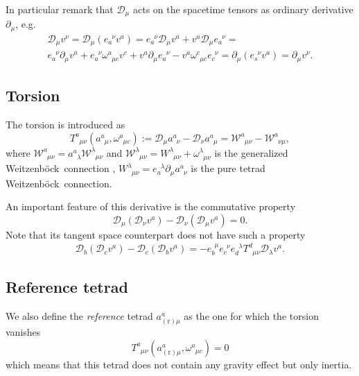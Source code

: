 \documentclass[
10pt, %
a4paper, %
oneside, %
headinclude,footinclude, %
BCOR5mm, %
]{scrartcl}
\newcommand{\pd}{\partial}
\newcommand{\itetr}[2]{e^{\phantom{#2}#1}_{#2}}
\newcommand{\tetr}[2]{a^{#1}_{\phantom{#1}#2}}
\newcommand{\rtetr}[2]{a^{#1}_{(\text{r}) #2}}
\newcommand{\spin}[2]{\omega^{#1}_{\phantom{#1}#2}}
\newcommand{\D}[1]{\mathcal{D}_{#1}} %
\newcommand{\Tors}[2]{T^{#1}_{\phantom{a}#2}}
\newcommand{\W}[2]{\mathcal{W}^{#1}_{\phantom{#1}#2}}
\newcommand{\w}[2]{W^{#1}_{\phantom{#1}#2}}
\newcommand{\We}{Weitzenb\"ock}
\begin{document}
In particular remark that $ \D{\mu} $ acts on the spacetime tensors as ordinary derivative $ 
\pd_\mu $, e.g.
\begin{multline}\label{eqn.covD.pd}
\D{\mu}v^{\nu} = \D{\mu}(\itetr{\nu}{a}v^a) = \itetr{\nu}{a}\D{\mu}v^a + v^a\D{\mu}\itetr{\nu}{a} = 
\\
\itetr{\nu}{a}\pd_{\mu}v^a + \itetr{\nu}{a}\spin{a}{\mu c}v^c + 
v^a\pd_{\mu}\itetr{\nu}{a} - v^a\spin{c}{\mu c}\itetr{\nu}{c} = \pd_\mu(\itetr{\nu}{s}v^a) = 
\pd_\mu v^\nu.
\end{multline}



\subsection{Torsion}

The torsion is introduced as
\begin{equation}
\Tors{a}{\mu\nu}(\tetr{a}{\mu},\spin{a}{\mu c}):=\D{\mu}\tetr{a}{\nu} - \D{\nu}\tetr{a}{\mu} = 
\W{a}{\mu\nu} - \W{a}{\nu\mu},
\end{equation}
where $ \W{a}{\mu\nu} = \tetr{a}{\lambda}\W{\lambda}{\mu\nu}$ and $ \W{\lambda}{\mu\nu} = 
\w{\lambda}{\mu\nu} + \spin{\lambda}{\mu\nu}$ is the 
generalized \We\ connection \cite{AldrovandiPereiraBook}, $ \w{\lambda}{\mu\nu} = 
\itetr{\lambda}{a}\pd_\mu \tetr{a}{\nu}$ is 
the pure tetrad \We\ connection.


An important feature of this derivative is the commutative property
\begin{equation}\label{eqn.commut.D}
\D{\mu}(\D{\nu} v^a) - \D{\nu}(\D{\mu} v^a) = 0.
\end{equation}
Note that its tangent space counterpart does not have such a property
\begin{equation}
\D{b}(\D{c} v^a) - \D{c}(\D{b} v^a) = 
-\itetr{\mu}{b}\itetr{\nu}{c}\itetr{\lambda}{d}\Tors{d}{\mu\nu}\D{\lambda}v^a .
\end{equation}

\subsection{Reference tetrad}

We also define the \textit{reference} tetrad $ \rtetr{a}{\mu} $ as the one for which the torsion 
vanishes
\begin{equation}
\Tors{a}{\mu\nu}(\rtetr{a}{\mu},\spin{a}{\mu c}) = 0
\end{equation}
which means that this tetrad does not contain any gravity effect but only inertia.
\end{document}
